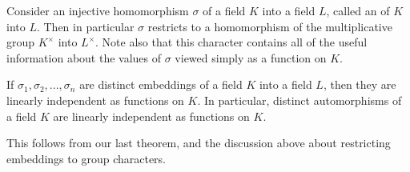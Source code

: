 Consider an injective homomorphism $\sigma$ of a field $K$ into a field $L$, called an  of $K$ into $L$. Then in particular $\sigma$ restricts to a homomorphism of the multiplicative group $K^{\times}$ into $L^{\times}$. Note also that this character contains all of the useful information about the values of $\sigma$ viewed simply as a function on $K$.

\begin{corollary}
    If $\sigma_1,\sigma_2,...,\sigma_n$ are distinct embeddings of a field $K$ into a field $L$, then they are linearly independent as functions on $K$. In particular, distinct automorphisms of a field $K$ are linearly independent as functions on $K$.
\end{corollary}
This follows from our last theorem, and the discussion above about restricting embeddings to group characters.


